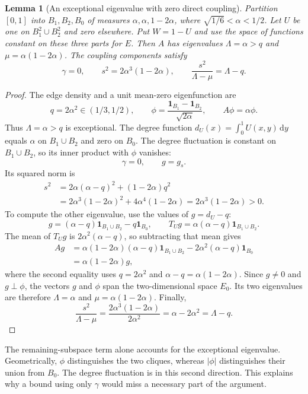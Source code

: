 \documentclass[11pt]{article}
\numberwithin{equation}{section}
\newtheorem{lemma}[theorem]{Lemma}
\newcommand{\one}{\mathbf 1}
\newcommand{\dd}{\,\mathrm d}
\begin{document}
\begin{lemma}[An exceptional eigenvalue with zero direct coupling]\label{lem:zero-coupling-example}
Partition $[0,1]$ into $B_1,B_2,B_0$ of measures
$\alpha,\alpha,1-2\alpha$, where $\sqrt{1/6}<\alpha<1/2$.
Let $U$ be one on $B_1^2\cup B_2^2$ and zero elsewhere. Put
$W=1-U$ and use the space of functions constant on these three
parts for $E$. Then $A$ has eigenvalues
$\Lambda=\alpha>q$ and $\mu=\alpha(1-2\alpha)$. The coupling
components satisfy
\[
 \gamma=0,\qquad s^2=2\alpha^3(1-2\alpha),\qquad
 \frac{s^2}{\Lambda-\mu}=\Lambda-q.
\]
\end{lemma}
\begin{proof}
The edge density and a unit mean-zero eigenfunction are
\[
 q=2\alpha^2\in(1/3,1/2),\qquad
 \phi=\frac{\one_{B_1}-\one_{B_2}}{\sqrt{2\alpha}},\qquad
 A\phi=\alpha\phi.
\]
Thus $\Lambda=\alpha>q$ is exceptional. The degree function
$d_U(x)=\int_0^1 U(x,y)\dd y$ equals $\alpha$ on $B_1\cup B_2$
and zero on $B_0$. The degree fluctuation is
constant on $B_1\cup B_2$, so its inner product with $\phi$ vanishes:
\[
 \gamma=0,\qquad g=g_s.
\]
Its squared norm is
\begin{align*}
 s^2&=2\alpha(\alpha-q)^2+(1-2\alpha)q^2\\
 &=2\alpha^3(1-2\alpha)^2+4\alpha^4(1-2\alpha)
   =2\alpha^3(1-2\alpha)>0.
\end{align*}
To compute the other eigenvalue, use the values of $g=d_U-q$:
\[
 g=(\alpha-q)\one_{B_1\cup B_2}-q\one_{B_0},
 \qquad T_Ug=\alpha(\alpha-q)\one_{B_1\cup B_2}.
\]
The mean of $T_Ug$ is $2\alpha^2(\alpha-q)$, so subtracting
that mean gives
\begin{align*}
 Ag&=\alpha(1-2\alpha)(\alpha-q)\one_{B_1\cup B_2}
       -2\alpha^2(\alpha-q)\one_{B_0}\\
   &=\alpha(1-2\alpha)g,
\end{align*}
where the second equality uses $q=2\alpha^2$ and
$\alpha-q=\alpha(1-2\alpha)$. Since $g\ne0$ and $g\perp\phi$,
the vectors $g$ and $\phi$ span the two-dimensional space $E_0$.
Its two eigenvalues are therefore $\Lambda=\alpha$ and
$\mu=\alpha(1-2\alpha)$. Finally,
\[
 \frac{s^2}{\Lambda-\mu}
  =\frac{2\alpha^3(1-2\alpha)}{2\alpha^2}
 =\alpha-2\alpha^2=\Lambda-q.
\]
\end{proof}
The remaining-subspace term alone accounts for the exceptional
eigenvalue. Geometrically, $\phi$ distinguishes the two cliques,
whereas $|\phi|$ distinguishes their union from $B_0$. The degree
fluctuation is in this second direction. This explains why a bound
using only $\gamma$ would miss a necessary part of the argument.
\end{document}
